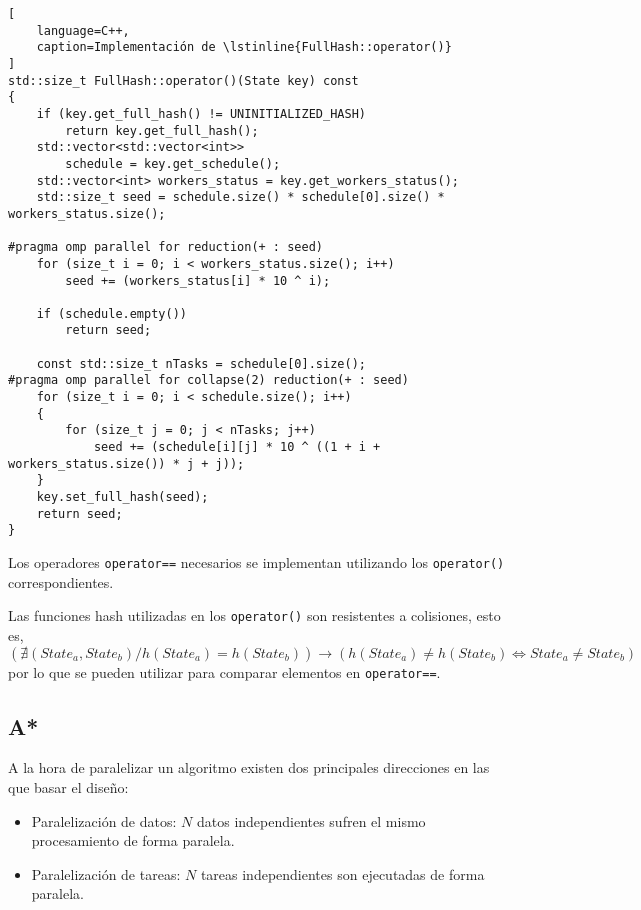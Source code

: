 \begin{lstlisting}[
    language=C++,
    caption=Implementación de \lstinline{FullHash::operator()}
]
std::size_t FullHash::operator()(State key) const
{
    if (key.get_full_hash() != UNINITIALIZED_HASH)
        return key.get_full_hash();
    std::vector<std::vector<int>>
        schedule = key.get_schedule();
    std::vector<int> workers_status = key.get_workers_status();
    std::size_t seed = schedule.size() * schedule[0].size() * workers_status.size();

#pragma omp parallel for reduction(+ : seed)
    for (size_t i = 0; i < workers_status.size(); i++)
        seed += (workers_status[i] * 10 ^ i);

    if (schedule.empty())
        return seed;

    const std::size_t nTasks = schedule[0].size();
#pragma omp parallel for collapse(2) reduction(+ : seed)
    for (size_t i = 0; i < schedule.size(); i++)
    {
        for (size_t j = 0; j < nTasks; j++)
            seed += (schedule[i][j] * 10 ^ ((1 + i + workers_status.size()) * j + j));
    }
    key.set_full_hash(seed);
    return seed;
}
\end{lstlisting}

Los operadores \lstinline{operator==} necesarios se implementan utilizando
los \lstinline{operator()} correspondientes.

\begin{notebox}
    Las funciones hash utilizadas en los \lstinline{operator()}
    son resistentes a colisiones,
    esto es, $
    (\nexists (State_a, State_b) / h(State_a) = h(State_b))
    \rightarrow
    (h(State_a) \ne h(State_b) \iff State_a \ne State_b)
    $
    por lo que se pueden
    utilizar para comparar elementos en \lstinline{operator==}.
\end{notebox}

\subsection{A*}

A la hora de paralelizar un algoritmo existen dos principales direcciones
en las que basar el diseño:
\begin{itemize}[itemsep=0.25px]
    \item Paralelización de datos: $N$ datos independientes sufren el mismo procesamiento de forma paralela.
    \item Paralelización de tareas: $N$ tareas independientes son ejecutadas de forma paralela.
\end{itemize}


